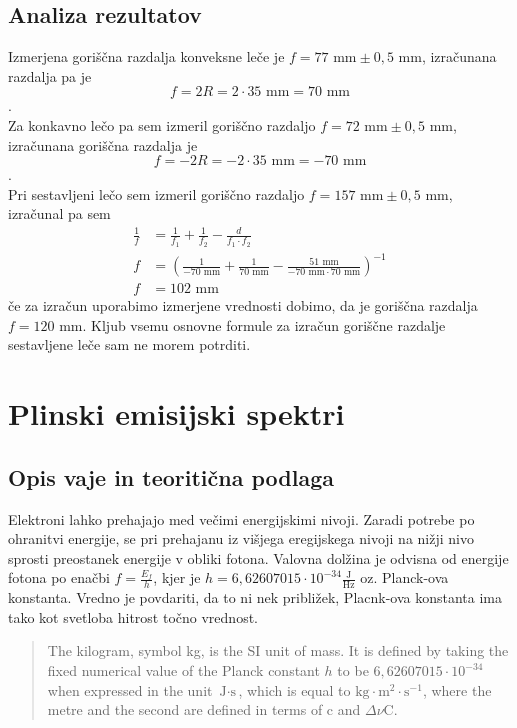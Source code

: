 \documentclass[12pt]{article}
\begin{document}
	\subsection*{Analiza rezultatov}
	Izmerjena goriščna razdalja konveksne leče je $f = 77 \text{ mm} \pm 0,5 \text{ mm}$,
	izračunana razdalja pa je 
	\begin{equation}
		f = 2R = 2 \cdot 35 \text{ mm} = 70 \text{ mm}
	\end{equation}.\\
	Za konkavno lečo pa sem izmeril goriščno razdaljo $f = 72 \text{ mm} \pm 0,5 \text{ mm}$, 
	izračunana goriščna razdalja je 
	\begin{equation}
		f = -2R = -2 \cdot 35 \text{ mm} = -70 \text{ mm}
	\end{equation}.\\
	Pri sestavljeni lečo sem izmeril goriščno razdaljo $f = 157 \text{ mm} \pm 0,5 \text{ mm}$,
	izračunal pa sem
	\begin{equation}
		\begin{split}
			\frac{1}{f} &= \frac{1}{f_1} + \frac{1}{f_2} - \frac{d}{f_1 \cdot f_2} \\
			f &= (\frac{1}{-70 \text{ mm}} + \frac{1}{70 \text{ mm}} - \frac{51 \text{ mm}}{-70 \text{ mm} \cdot 70 \text{ mm}})^{-1}\\
			f &= 102 \text{ mm}
		\end{split}
	\end{equation}
	če za izračun uporabimo izmerjene vrednosti dobimo, da je goriščna razdalja $f = 120 \text{ mm}$.
	Kljub vsemu osnovne formule za izračun goriščne razdalje sestavljene leče sam ne morem
	potrditi.


\newpage
\section{Plinski emisijski spektri}
	\subsection*{Opis vaje in teoritična podlaga}
	Elektroni lahko prehajajo med večimi energijskimi nivoji. Zaradi potrebe po ohranitvi
	energije, se pri prehajanu iz višjega eregijskega nivoji na nižji nivo sprosti preostanek
	energije v obliki fotona. Valovna dolžina je odvisna od energije fotona po enačbi $f = \frac{E_f}{h}$,
	kjer je $h = 6,62607015 \cdot 10^{-34} \frac{\text{J}}{\text{Hz}}$ oz. Planck-ova konstanta.
	Vredno je povdariti, da to ni nek približek, Placnk-ova konstanta ima tako
	kot svetloba hitrost točno vrednost.
	\begin{quote} 
		The kilogram, symbol kg, is the SI unit of mass. It is defined by taking the fixed
		numerical value of the Planck constant $h$ to be $6,62607015 \cdot 10^{-34}$ when
		expressed in the unit $\text{J} \cdot \text{s}$, which is equal to $\text{kg} \cdot \text{m}^2 \cdot \text{s}^{-1}$,
		where the metre and the second are defined in terms of c and $\Delta \nu \text{C}$. \cite{redef}
	\end{quote}
\end{document}
